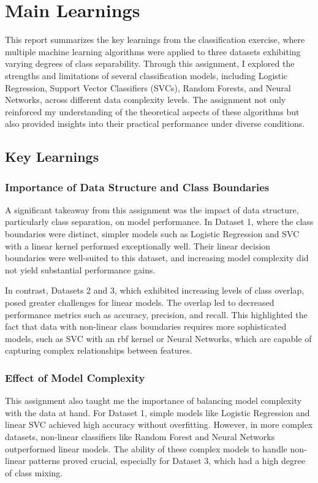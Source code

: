 \section*{Main Learnings}

This report summarizes the key learnings from the classification exercise, where multiple machine learning algorithms were applied to three datasets exhibiting varying degrees of class separability. Through this assignment, I explored the strengths and limitations of several classification models, including Logistic Regression, Support Vector Classifiers (SVCs), Random Forests, and Neural Networks, across different data complexity levels. The assignment not only reinforced my understanding of the theoretical aspects of these algorithms but also provided insights into their practical performance under diverse conditions.

\subsection*{Key Learnings}
\subsubsection*{Importance of Data Structure and Class Boundaries}
A significant takeaway from this assignment was the impact of data structure, particularly class separation, on model performance. In Dataset 1, where the class boundaries were distinct, simpler models such as Logistic Regression and SVC with a linear kernel performed exceptionally well. Their linear decision boundaries were well-suited to this dataset, and increasing model complexity did not yield substantial performance gains.

In contrast, Datasets 2 and 3, which exhibited increasing levels of class overlap, posed greater challenges for linear models. The overlap led to decreased performance metrics such as accuracy, precision, and recall. This highlighted the fact that data with non-linear class boundaries requires more sophisticated models, such as SVC with an rbf kernel or Neural Networks, which are capable of capturing complex relationships between features.

\subsubsection*{Effect of Model Complexity}
This assignment also taught me the importance of balancing model complexity with the data at hand. For Dataset 1, simple models like Logistic Regression and linear SVC achieved high accuracy without overfitting. However, in more complex datasets, non-linear classifiers like Random Forest and Neural Networks outperformed linear models. The ability of these complex models to handle non-linear patterns proved crucial, especially for Dataset 3, which had a high degree of class mixing.

